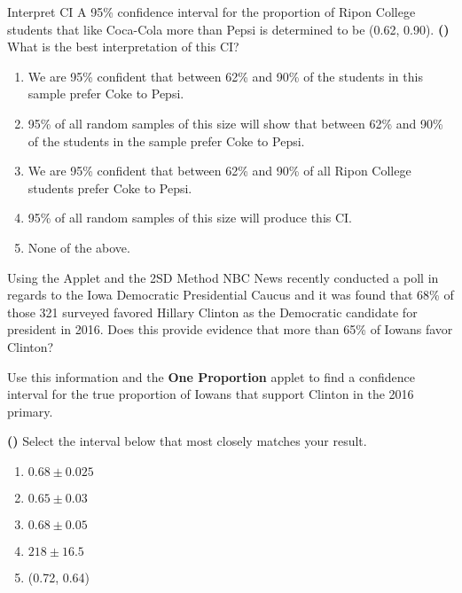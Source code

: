 \documentclass[13pt]{beamer}
\newcounter{count}
\newcommand{\question}{\textbf{(\decimal{count})} \stepcounter{count}}
\newenvironment{click}{\begin{enumerate}[A]}{\end{enumerate}}
\begin{document}
\begin{frame}{Interpret CI}
A 95\% confidence interval for the proportion of Ripon College students that like Coca-Cola more than Pepsi is determined to be (0.62, 0.90). \smallskip
\question What is the best interpretation of this CI?

\begin{click}
	\item We are 95\% confident that between 62\% and 90\% of the students in this sample prefer Coke to Pepsi.
    \item 95\% of all random samples of this size will show that between 62\% and 90\% of the students in the sample prefer Coke to Pepsi.
    \item We are 95\% confident that between 62\% and 90\% of all Ripon College students prefer Coke to Pepsi. %
    \item 95\% of all random samples of this size will produce this CI.
    \item None of the above.
\end{click}

\end{frame}

\begin{frame}{Using the Applet and the 2SD Method}
NBC News recently conducted a poll in regards to the Iowa Democratic Presidential Caucus and it was found that 68\% of those 321 surveyed favored Hillary Clinton as the Democratic candidate for president in 2016.  Does this provide evidence that more than 65\% of Iowans favor Clinton?

\smallskip

Use this information and the \textbf{One Proportion} applet to find a confidence interval for the true proportion of Iowans that support Clinton in the 2016 primary.  

\question Select the interval below that most closely matches your result.

\begin{multicols}{2}
\begin{click}
	\item $0.68 \pm 0.025$
    \item $0.65 \pm 0.03$
    \item $0.68 \pm 0.05$ %
    \item $218 \pm 16.5$ %
    \item (0.72, 0.64)
\end{click}
\end{multicols}

\end{frame}
\end{document}
